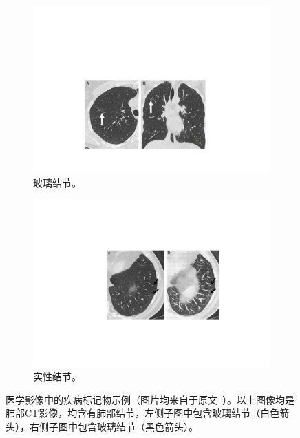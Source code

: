 \begin{figure}[h!]
	\centering
	\begin{subfigure}{0.5\textwidth}
		\centering
		\includegraphics[width=1\textwidth]{figure/ground_glass_nodule}
		\caption{玻璃结节。}
		\label{subfig:ground_glass_nodule}
	\end{subfigure}
	\quad
	\begin{subfigure}{0.462\textwidth}
		\centering
		\includegraphics[width=1\textwidth]{figure/solid_nodule}
		\caption{实性结节。}
		\label{subfig:solid_nodule}
	\end{subfigure}
	\caption{医学影像中的疾病标记物示例（图片均来自于原文~\cite{brandman2011pulmonary}）。以上图像均是肺部CT影像，均含有肺部结节，左侧子图中包含玻璃结节（白色箭头），右侧子图中包含玻璃结节（黑色箭头）。}
	\label{mul_fig:medical_imaging_biomarkers_examplar}
\end{figure}

